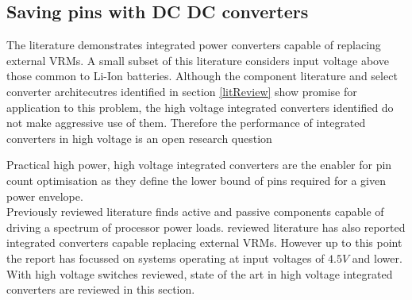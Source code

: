 \documentclass[letterpaper,twocolumn,10pt]{article}
\begin{document}
\subsection{Saving pins with DC DC converters}

The literature demonstrates integrated power converters capable of replacing external VRMs. A small subset of this literature considers input voltage above those common to Li-Ion batteries. 
\indent Although the component literature and select converter architecutres identified in section \ref{litReview} show promise for application to this problem, the high voltage integrated converters identified do not make aggressive use of them. Therefore the performance of integrated converters in high voltage is an open research question

Practical high power, high voltage integrated converters are the enabler for pin count optimisation as they define the lower bound of pins required for a given power envelope.\\
Previously reviewed literature finds active and passive components capable of driving a spectrum of processor power loads. reviewed literature has also reported integrated converters capable replacing external VRMs. However up to this point the report has focussed on systems operating at input voltages of $4.5V$ and lower. With high voltage switches reviewed, state of the art in high voltage integrated converters are reviewed in this section.\\
\end{document}
